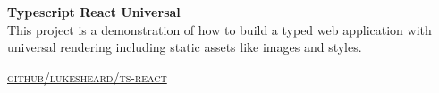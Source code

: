 {\raggedright
  \textbf{Typescript React Universal}
  \\

  This project is a demonstration of how to build a typed web application with universal rendering including static assets like images and styles.

  \textsc{\small\href{http://github.com/LukeSheard/typescript-universal-boilerplate-react}{github/lukesheard/ts-react}}
} \\
